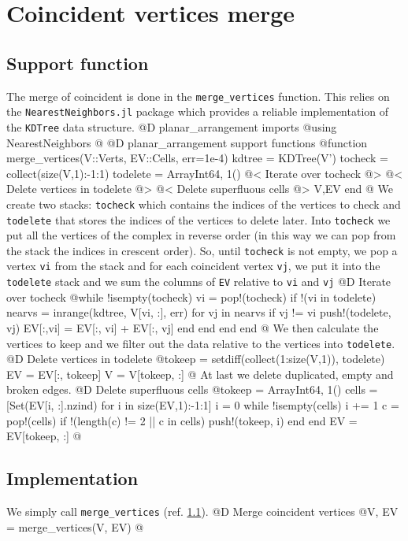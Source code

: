 \documentclass[10pt]{book}
\begin{document}
\section{Coincident vertices merge}
\subsection{Support function}
\label{sec:merge_vertices}
The merge of coincident is done in the \texttt{merge\_vertices}
function. This relies on the \texttt{NearestNeighbors.jl} package\cite{NearestNeighbors}
which provides a reliable implementation of the \texttt{KDTree} data structure.
@D planar\_arrangement imports
@{using NearestNeighbors
@}
@D planar\_arrangement support functions
@{function merge_vertices(V::Verts, EV::Cells, err=1e-4)
    kdtree = KDTree(V')
    tocheck = collect(size(V,1):-1:1)
    todelete = Array{Int64, 1}()
    @< Iterate over tocheck @>
    @< Delete vertices in todelete @>
    @< Delete superfluous cells @>
    V,EV
end
@}
We create two stacks: \texttt{tocheck} which contains the indices of the vertices
to check and \texttt{todelete} that stores the indices of the vertices to delete later.
Into \texttt{tocheck} we put all the vertices of the complex in reverse order (in
this way we can pop from the stack the indices in crescent order). So, until \texttt{tocheck} is not empty,
we pop a vertex \texttt{vi} from the stack and for each coincident vertex \texttt{vj}, we put it 
into the \texttt{todelete} stack and we sum the columns of \texttt{EV} relative to \texttt{vi} and \texttt{vj}
@D Iterate over tocheck 
@{while !isempty(tocheck)
    vi = pop!(tocheck)
    if !(vi in todelete)
        nearvs = inrange(kdtree, V[vi, :], err)
        for vj in nearvs
            if vj != vi
                push!(todelete, vj)
                EV[:,vi] = EV[:, vi] + EV[:, vj]
            end
        end
    end
end
@}
We then calculate the vertices to keep and we filter out
the data relative to the vertices into \texttt{todelete}.
@D Delete vertices in todelete
@{tokeep = setdiff(collect(1:size(V,1)), todelete)
EV = EV[:, tokeep]
V = V[tokeep, :]
@}
At last we delete duplicated, empty and broken edges.
@D Delete superfluous cells
@{tokeep = Array{Int64, 1}()
cells = [Set(EV[i, :].nzind) for i in size(EV,1):-1:1]
i = 0
while !isempty(cells)
    i += 1
    c = pop!(cells)
    if !(length(c) != 2 || c in cells)
        push!(tokeep, i)
    end
end
EV = EV[tokeep, :]
@}
\subsection{Implementation}
We simply call \texttt{merge\_vertices} (ref. \ref{sec:merge_vertices}).
@D Merge coincident vertices
@{V, EV = merge_vertices(V, EV)
@}
\end{document}
